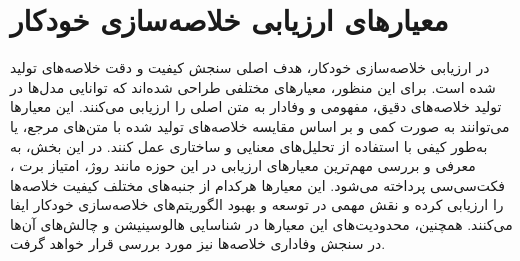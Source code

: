 \section{معیارهای ارزیابی خلاصه‌سازی خودکار}
در ارزیابی خلاصه‌سازی خودکار، هدف اصلی سنجش کیفیت و دقت خلاصه‌های تولید شده است. برای این منظور، معیارهای مختلفی طراحی شده‌اند که توانایی مدل‌ها در تولید خلاصه‌های دقیق، مفهومی و وفادار به متن اصلی را ارزیابی می‌کنند. این معیارها می‌توانند به صورت کمی و بر اساس مقایسه خلاصه‌های تولید شده با متن‌های مرجع، یا به‌طور کیفی با استفاده از تحلیل‌های معنایی و ساختاری عمل کنند. در این بخش، به معرفی و بررسی مهم‌ترین معیارهای ارزیابی در این حوزه مانند روژ، امتیاز برت ، فکت‌سی‌سی پرداخته می‌شود. این معیارها هرکدام از جنبه‌های مختلف کیفیت خلاصه‌ها را ارزیابی کرده و نقش مهمی در توسعه و بهبود الگوریتم‌های خلاصه‌سازی خودکار ایفا می‌کنند. همچنین، محدودیت‌های این معیارها در شناسایی هالوسینیشن و چالش‌های آن‌ها در سنجش وفاداری خلاصه‌ها نیز مورد بررسی قرار خواهد گرفت.
